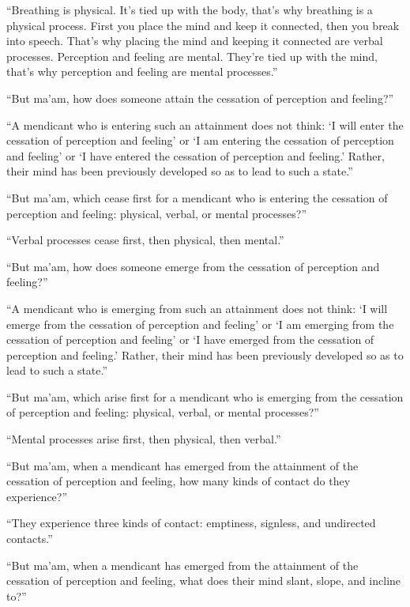 \documentclass[12pt,openany]{book}%
\begin{document}
“Breathing is physical. It’s tied up with the body, that’s why breathing is a physical process. First you place the mind and keep it connected, then you break into speech. That’s why placing the mind and keeping it connected are verbal processes. Perception and feeling are mental. They’re tied up with the mind, that’s why perception and feeling are mental processes.” 

“But ma’am, how does someone attain the cessation of perception and feeling?” 

“A mendicant who is entering such an attainment does not think: ‘I will enter the cessation of perception and feeling’ or ‘I am entering the cessation of perception and feeling’ or ‘I have entered the cessation of perception and feeling.’ Rather, their mind has been previously developed so as to lead to such a state.” 

“But ma’am, which cease first for a mendicant who is entering the cessation of perception and feeling: physical, verbal, or mental processes?” 

“Verbal processes cease first, then physical, then mental.” 

“But ma’am, how does someone emerge from the cessation of perception and feeling?” 

“A mendicant who is emerging from such an attainment does not think: ‘I will emerge from the cessation of perception and feeling’ or ‘I am emerging from the cessation of perception and feeling’ or ‘I have emerged from the cessation of perception and feeling.’ Rather, their mind has been previously developed so as to lead to such a state.” 

“But ma’am, which arise first for a mendicant who is emerging from the cessation of perception and feeling: physical, verbal, or mental processes?” 

“Mental processes arise first, then physical, then verbal.” 

“But ma’am, when a mendicant has emerged from the attainment of the cessation of perception and feeling, how many kinds of contact do they experience?” 

“They experience three kinds of contact: emptiness, signless, and undirected contacts.” 

“But ma’am, when a mendicant has emerged from the attainment of the cessation of perception and feeling, what does their mind slant, slope, and incline to?” 
\end{document}
